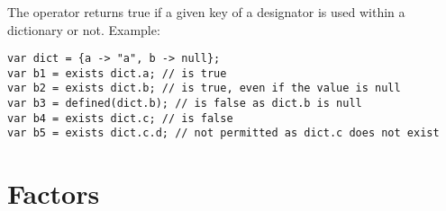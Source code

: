 \begin{grammar}
      \produces {} \\
      \produces {}  \\
      \produces {}
         \lextoken{(}  \lextoken{)} \\
      \produces {} \\
      \produces {} \\
      \produces {} \\
      \produces {} \\
      \produces \lextoken{(}  \lextoken{)} \\
      \produces {} \\
      \produces {} \\
      \produces {} \\
      \produces {} \\
      \produces {} \\
      \produces {} \\
      \produces {} \\
      \produces {}
\end{grammar}

\noindent
The  operator returns true if a given key of a designator
is used within a dictionary or not. Example:

\begin{lstlisting}
var dict = {a -> "a", b -> null};
var b1 = exists dict.a; // is true
var b2 = exists dict.b; // is true, even if the value is null
var b3 = defined(dict.b); // is false as dict.b is null
var b4 = exists dict.c; // is false
var b5 = exists dict.c.d; // not permitted as dict.c does not exist
\end{lstlisting}

\section{Factors}

\begin{grammar}
      \produces {} \\
      \produces \lextoken{$-$}  \\
      \produces \lextoken{!} 
\end{grammar}

